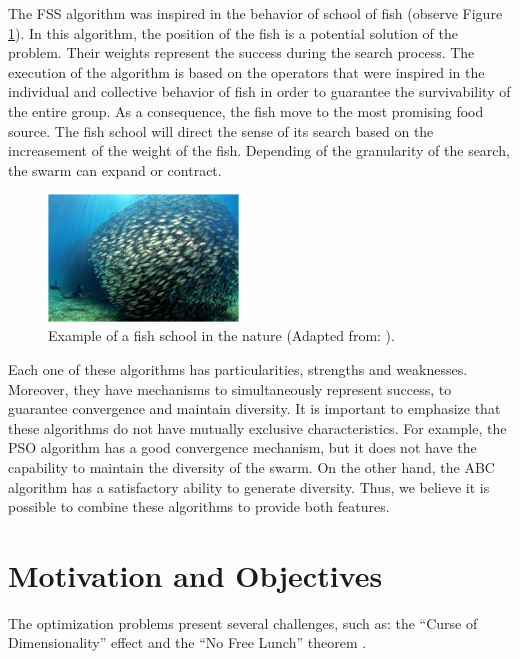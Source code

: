The FSS algorithm was inspired in the behavior of school of fish (observe Figure
\ref{fig:school_fish}). In this algorithm, the position of the fish is a
potential solution of the problem. Their weights represent the success during
the search process. The execution of the algorithm is based on the
operators that were inspired in the individual and collective behavior of fish
in order to guarantee the survivability of the entire group. As a consequence, the fish move to the most promising food source. The fish school
will direct the sense of its search based on the increasement of the weight of
the fish. Depending of the granularity of the search, the swarm can expand or
contract.
\begin{figure}[!h]
\centering
 \includegraphics[width=0.45\textwidth]{image/school_of_fish.jpg}
 \caption{\small{Example of a fish school in the nature (Adapted from:
\cite{SI:Fish2012}).}}
 \label{fig:school_fish}
\end{figure}

Each one of these algorithms has particularities, strengths and weaknesses.
Moreover, they have mechanisms to simultaneously represent success, to guarantee
convergence and maintain diversity. It is important to emphasize that these
algorithms do not have mutually exclusive characteristics. For example, the PSO
algorithm has a good convergence mechanism, but it does not have the capability
to maintain the diversity of the swarm. On the other hand, the ABC algorithm has
a satisfactory ability to generate diversity. Thus, we believe it is possible to combine these algorithms to provide both features.

\section{Motivation and Objectives}
The optimization problems present several challenges, such as: the ``Curse of Dimensionality'' effect \cite{SI:Houle2010} \cite{SI:Powell2007} \cite{SI:Radovanovic2010} and the ``No Free Lunch'' theorem \cite{SI:Wolpert1995} \cite{SI:Wolpert1997} \cite{SI:Droste2002}.

